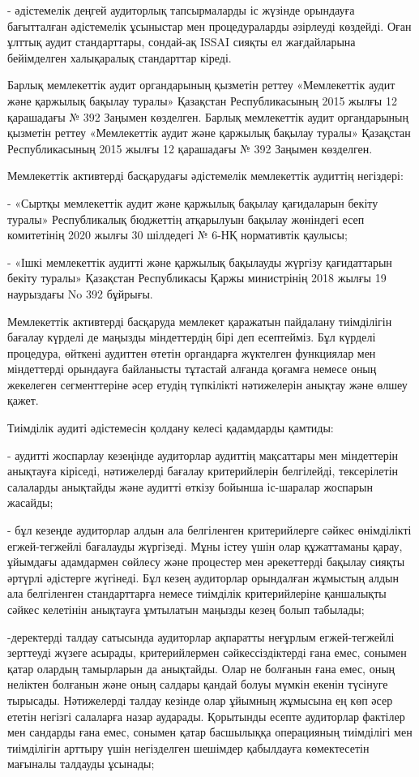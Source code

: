- әдістемелік деңгей аудиторлық тапсырмаларды іс жүзінде орындауға
бағытталған әдістемелік ұсыныстар мен процедураларды әзірлеуді көздейді.
Оған ұлттық аудит стандарттары, сондай-ақ ISSAI сияқты ел жағдайларына
бейімделген халықаралық стандарттар кіреді.

Барлық мемлекеттік аудит органдарының қызметін реттеу «Мемлекеттік аудит
және қаржылық бақылау туралы» Қазақстан Республикасының 2015 жылғы 12
қарашадағы № 392 Заңымен көзделген. Барлық мемлекеттік аудит
органдарының қызметін реттеу «Мемлекеттік аудит және қаржылық бақылау
туралы» Қазақстан Республикасының 2015 жылғы 12 қарашадағы № 392 Заңымен
көзделген.

Мемлекеттік активтерді басқарудағы әдістемелік мемлекеттік аудиттің
негіздері:

- «Сыртқы мемлекеттік аудит және қаржылық бақылау қағидаларын бекіту
туралы» Республикалық бюджеттің атқарылуын бақылау жөніндегі есеп
комитетінің 2020 жылғы 30 шілдедегі № 6-НҚ нормативтік қаулысы;

- «Ішкі мемлекеттік аудитті және қаржылық бақылауды жүргізу қағидаттарын
бекіту туралы» Қазақстан Республикасы Қаржы министрінің 2018 жылғы 19
наурыздағы No 392 бұйрығы.

Мемлекеттік активтерді басқаруда мемлекет қаражатын пайдалану
тиімділігін бағалау күрделі де маңызды міндеттердің бірі деп есептейміз.
Бұл күрделі процедура, өйткені аудиттен өтетін органдарға жүктелген
функциялар мен міндеттерді орындауға байланысты тұтастай алғанда қоғамға
немесе оның жекелеген сегменттеріне әсер етудің түпкілікті нәтижелерін
анықтау және өлшеу қажет.

Тиімділік аудиті әдістемесін қолдану келесі қадамдарды қамтиды:

- аудитті жоспарлау кезеңінде аудиторлар аудиттің мақсаттары мен
міндеттерін анықтауға кіріседі, нәтижелерді бағалау критерийлерін
белгілейді, тексерілетін салаларды анықтайды және аудитті өткізу бойынша
іс-шаралар жоспарын жасайды;

- бұл кезеңде аудиторлар алдын ала белгіленген критерийлерге сәйкес
өнімділікті егжей-тегжейлі бағалауды жүргізеді. Мұны істеу үшін олар
құжаттаманы қарау, ұйымдағы адамдармен сөйлесу және процестер мен
әрекеттерді бақылау сияқты әртүрлі әдістерге жүгінеді. Бұл кезең
аудиторлар орындалған жұмыстың алдын ала белгіленген стандарттарға
немесе тиімділік критерийлеріне қаншалықты сәйкес келетінін анықтауға
ұмтылатын маңызды кезең болып табылады;

-деректерді талдау сатысында аудиторлар ақпаратты неғұрлым
егжей-тегжейлі зерттеуді жүзеге асырады, критерийлермен
сәйкессіздіктерді ғана емес, сонымен қатар олардың тамырларын да
анықтайды. Олар не болғанын ғана емес, оның неліктен болғанын және оның
салдары қандай болуы мүмкін екенін түсінуге тырысады. Нәтижелерді талдау
кезінде олар ұйымның жұмысына ең көп әсер ететін негізгі салаларға назар
аударады. Қорытынды есепте аудиторлар фактілер мен сандарды ғана емес,
сонымен қатар басшылыққа операцияның тиімділігі мен тиімділігін арттыру
үшін негізделген шешімдер қабылдауға көмектесетін мағыналы талдауды
ұсынады;

